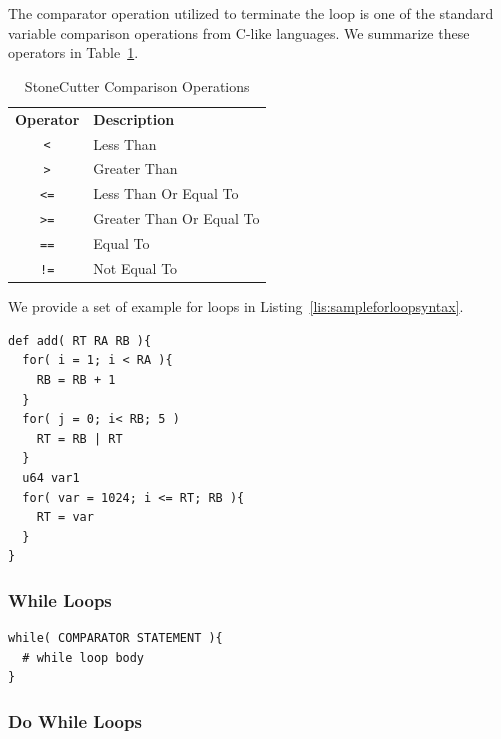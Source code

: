 \documentclass{article}
\begin{document}
The comparator operation utilized to terminate the loop is one of the standard 
variable comparison operations from C-like languages.  We summarize these operators in 
Table~\ref{tab:compreops}.  

\begin{table}[h]
\begin{center}
\caption{StoneCutter Comparison Operations}
\vspace{0.125in}
\label{tab:compreops}
\begin{tabular}{|c|l|}
\hline
\textbf{Operator} & \textbf{Description} \\
\texttt{<} & Less Than\\
\hline
\texttt{>} & Greater Than\\
\hline
\texttt{<=} & Less Than Or Equal To\\
\hline
\texttt{>=} & Greater Than Or Equal To\\
\hline
\texttt{==} & Equal To\\
\hline
\texttt{!=} & Not Equal To\\
\hline
\end{tabular}
\end{center}
\end{table}

We provide a set of example for loops in Listing~\ref{lis:sampleforloopsyntax}.  

\vspace{0.125in}
\begin{lstlisting}[frame=single,style=base,caption={Sample For Loop Syntax},captionpos=b,label={lis:sampleforloopsyntax}]
def add( RT RA RB ){
  for( i = 1; i < RA ){
    RB = RB + 1
  }
  for( j = 0; i< RB; 5 )
    RT = RB | RT
  }
  u64 var1
  for( var = 1024; i <= RT; RB ){
    RT = var
  }
}
\end{lstlisting}

\subsubsection{While Loops}
\label{sec:WhileLoops}

\vspace{0.125in}
\begin{lstlisting}[frame=single,style=base,caption={While Loop Syntax},captionpos=b,label={lis:whileloopsyntax}]
while( COMPARATOR STATEMENT ){
  # while loop body
}
\end{lstlisting}

\subsubsection{Do While Loops}
\label{sec:DoWhileLoops}
\end{document}
